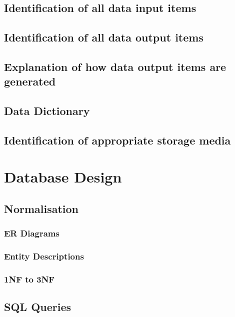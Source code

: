 \subsection{Identification of all data input items}

\subsection{Identification of all data output items}

\subsection{Explanation of how data output items are generated}

\subsection{Data Dictionary}

\subsection{Identification of appropriate storage media}

\section{Database Design}

\subsection{Normalisation}

\subsubsection{ER Diagrams}

\subsubsection{Entity Descriptions}

\subsubsection{1NF to 3NF}

\subsection{SQL Queries}

